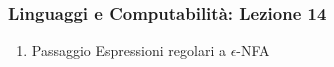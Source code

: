 




\begin{frame}[fragile]
	\frametitle{Linguaggi e Computabilità: Lezione 14}
\begin{enumerate}
\item
Passaggio Espressioni regolari a $\epsilon$-NFA
\end{enumerate}
\end{frame}



